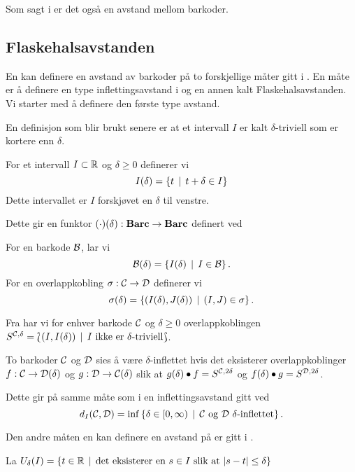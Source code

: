 Som sagt i  er det også en avstand mellom barkoder.

\subsection{Flaskehalsavstanden}
En kan definere en avstand av barkoder på to forskjellige måter gitt i \cite{Bauer2018}. En måte er å definere en type inflettingsavstand i \Barc og en annen kalt Flaskehalsavstanden. Vi starter med å definere den første type avstand.

En definisjon som blir brukt senere er at et intervall $I$ er kalt $\delta$-triviell som er kortere enn $\delta$. 

\begin{definisjon}\label{def:IntSkyv}
    For et intervall $I\subset\mathbb{R}$ og $\delta\geq 0$ definerer vi
    \[I(\delta) = \left\{t\,\mid\,t+\delta\in I\right\}\]
    Dette intervallet er $I$ forskjøvet en $\delta$ til venstre.
\end{definisjon}

Dette gir en funktor $(\cdot)(\delta):\textnormal{\textbf{Barc}}\to\textnormal{\textbf{Barc}}$ definert ved

\begin{definisjon}
    For en barkode $\mathcal{B}$, lar vi
    \[\mathcal{B}(\delta) = \left\{I(\delta)\,\mid\,I\in\mathcal{B}\right\}.\]
    For en overlappkobling $\sigma:\mathcal{C}\to\mathcal{D}$ definerer vi
    \[\sigma(\delta) = \left\{(I(\delta),J(\delta))\,\mid\,(I,J)\in\sigma\right\}.\]
\end{definisjon}

Fra \cite{Bauer2018} har vi for enhver barkode $\mathcal{C}$ og $\delta\geq0$ overlappkoblingen $S^{\mathcal{C},\delta} = \Lbag (I,I(\delta))\,\mid\, \text{$I$ ikke er $\delta$-triviell}\Rbag$. 

\begin{definisjon}\label{def:InfBar}
To barkoder $\mathcal{C}$ og $\mathcal{D}$ sies å være $\delta$-inflettet hvis det eksisterer overlappkoblinger $f:\mathcal{C}\to \mathcal{D}(\delta)$ og $g:\mathcal{D}\to\mathcal{C}(\delta)$ slik at $g(\delta)\bullet f = S^{\mathcal{C},2\delta}$ og $f(\delta)\bullet g=S^{\mathcal{D},2\delta}$.
\end{definisjon}

Dette gir på samme måte som i  en inflettingsavstand gitt ved
\[d_I(\mathcal{C},\mathcal{D}) = \inf\left\{\delta\in[0,\infty)\,\mid\,\text{$\mathcal{C}$ og $\mathcal{D}$ $\delta$-inflettet}\right\}.\]

Den andre måten en kan definere en avstand på er gitt i \cite[seksjon 4.2]{Bauer2018}.

La $U_\delta(I) = \left\{t\in\mathbb{R}\,\mid\,\text{det eksisterer en $s\in I$ slik at }|s-t|\leq\delta\right\}$

